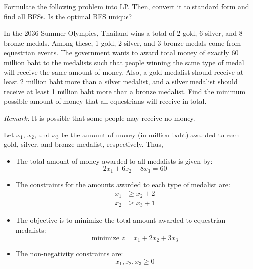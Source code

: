 \documentclass[a4paper, 10pt]{article}
\begin{document}
\begin{tosubmit}
\problem[4] Formulate the following problem into LP.
Then, convert it to standard form and find all BFSs. Is the optimal BFS unique?

\vspace{3mm}

In the 2036 Summer Olympics, Thailand wins a total of 2 gold, 6 silver, and 8 bronze medals.
Among these, 1 gold, 2 silver, and 3 bronze medals come from equestrian events.
The government wants to award total money of exactly 60 million baht to the medalists such that people winning the same type of medal will receive the same amount of money.
Also, a gold medalist should receive at least 2 million baht more than a silver medalist, and a silver medalist should receive at least 1 million baht more than a bronze medalist.
Find the minimum possible amount of money that all equestrians will receive in total.

\vspace{3mm}

\textit{Remark:} It is possible that some people may receive no money.

\vspace{3mm}

\par\noindent\submitsolution
Let \( x_1 \), \( x_2 \), and \( x_3 \) be the amount of money (in million baht) awarded to each gold, silver, and bronze medalist, respectively.
Thus,
\begin{itemize}
    \item The total amount of money awarded to all medalists is given by:
    \[ 2x_1 + 6x_2 + 8x_3 = 60 \]

    \item The constraints for the amounts awarded to each type of medalist are:
    \begin{align*}
        x_1 &\geq x_2 + 2 \\
        x_2 &\geq x_3 + 1
    \end{align*}

    \item The objective is to minimize the total amount awarded to equestrian medalists:
    \[ \text{minimize } z = x_1 + 2x_2 + 3x_3 \]

    \item The non-negativity constraints are:
    \[ x_1, x_2, x_3 \geq 0 \]
\end{itemize}

\vspace{2mm}


\end{tosubmit}
\end{document}
